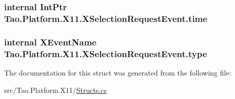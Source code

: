 \label{struct_tao_1_1_platform_1_1_x11_1_1_x_selection_request_event_a65f33506b20d5eca4e4371d617599e8d}
\hypertarget{struct_tao_1_1_platform_1_1_x11_1_1_x_selection_request_event_a719862cd9110ad98fee52340d39ab487}{
\subsubsection[{time}]{\setlength{\rightskip}{0pt plus 5cm}internal IntPtr {\bf Tao.Platform.X11.XSelectionRequestEvent.time}}}
\label{struct_tao_1_1_platform_1_1_x11_1_1_x_selection_request_event_a719862cd9110ad98fee52340d39ab487}
\hypertarget{struct_tao_1_1_platform_1_1_x11_1_1_x_selection_request_event_aac1311b77f52b72cf30c01b030bfcb60}{
\subsubsection[{type}]{\setlength{\rightskip}{0pt plus 5cm}internal {\bf XEventName} {\bf Tao.Platform.X11.XSelectionRequestEvent.type}}}
\label{struct_tao_1_1_platform_1_1_x11_1_1_x_selection_request_event_aac1311b77f52b72cf30c01b030bfcb60}


The documentation for this struct was generated from the following file:\begin{DoxyCompactItemize}
\item 
src/Tao.Platform.X11/\hyperlink{_structs_8cs}{Structs.cs}\end{DoxyCompactItemize}
